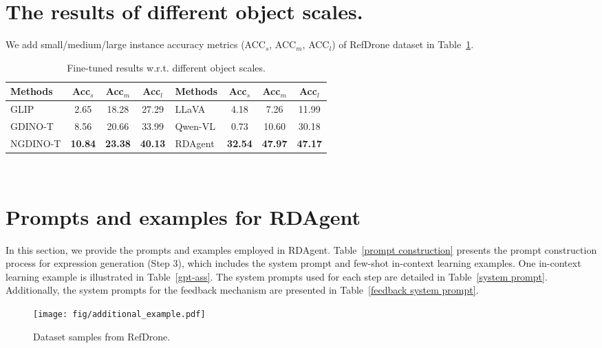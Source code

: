 \section{The results of different object scales.}
\label{sup:scale}
We add small/medium/large instance accuracy metrics (ACC$_s$, ACC$_m$, ACC$_l$) of RefDrone dataset in Table~\ref{tab:sml}.
\begin{table}[h]
\caption{Fine-tuned results w.r.t. different object scales.}

\label{tab:sml}
\centering
\begin{adjustbox}{width=\linewidth}
\begin{tabular}{l| ccc |l| ccc}
    \toprule
    Methods & Acc$_{s}$ & Acc$_{m}$ & Acc$_{l}$ & Methods & Acc$_{s}$ & Acc$_{m}$ & Acc$_{l}$\\
    \midrule
    GLIP & 2.65 & 18.28 & 27.29 &  LLaVA & 4.18 & 7.26 & 11.99\\
    GDINO-T  & 8.56 & 20.66 & 33.99 & Qwen-VL &  0.73 & 10.60 & 30.18\\
    NGDINO-T & \textbf{10.84}  & \textbf{23.38}  & \textbf{40.13} & RDAgent  & \textbf{32.54} & \textbf{47.97}  & \textbf{47.17} \\
    \bottomrule
\end{tabular}
\end{adjustbox}
\end{table}
\



\section{Prompts and examples for RDAgent}
\label{sup:prompt}
In this section, we provide the prompts and examples employed in RDAgent. Table~\ref{prompt construction} presents the prompt construction process for expression generation (Step 3), which includes the system prompt and few-shot in-context learning examples. One in-context learning example is illustrated in Table~\ref{gpt-ass}. The system prompts used for each step are detailed in Table~\ref{system prompt}. Additionally, the system prompts for the feedback mechanism are presented in Table~\ref{feedback system prompt}.





\begin{figure*}[h!]
\centering
\texttt{[image: fig/additional\_example.pdf]}
\vspace{-5pt}
\caption{Dataset samples from RefDrone.} 
\label{fig:example}
\end{figure*}



 








